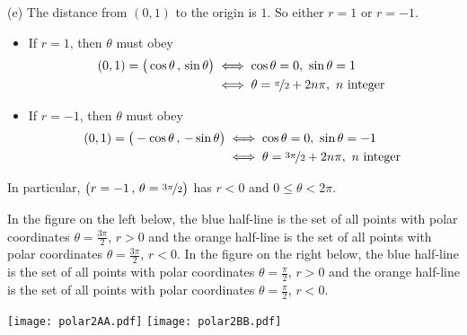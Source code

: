 \begin{solution}
(e)
The distance from $(0,1)$ to the origin is $1$. 
So either $r=1$ or $r=-1$.
\begin{itemize}
\item If $r=1$, then $\theta$ must obey 
\begin{align*}
(0,1) = \big(\cos\theta\,,\,\sin\theta\big)
&\iff \cos\theta=0,\ \sin\theta=1 \\
&\iff \theta= \nicefrac{\pi}{2} + 2n\pi,\ n\text{ integer }
\end{align*}
\item If $r=-1$, then $\theta$ must obey 
\begin{align*}
(0,1) = \big(-\cos\theta\,,\,-\sin\theta\big)
&\iff \cos\theta=0,\ \sin\theta=-1 \\
&\iff \theta= \nicefrac{3\pi}{2} + 2n\pi,\ n\text{ integer }
\end{align*}
\end{itemize}
In particular,  $\big(r=-1\,,\,
    \theta= \nicefrac{3\pi}{2}\big)$ has $r<0$
    and $0\le\theta<2\pi$.

In the figure on the left below, the blue half-line is the set of all points 
with polar coordinates $\theta=\frac{3\pi}{2}$, $r>0$ and the orange half-line is the set 
of all points  with polar coordinates $\theta=\frac{3\pi}{2}$, $r<0$. 
In the figure on the right below, the blue half-line is the set of all points 
with polar coordinates $\theta=\frac{\pi}{2}$, $r>0$ and the orange half-line is the set 
of all points  with polar coordinates $\theta=\frac{\pi}{2}$, $r<0$. 
\begin{center}
  \texttt{[image: polar2AA.pdf]}\qquad
  \texttt{[image: polar2BB.pdf]}
\end{center}


\end{solution}



